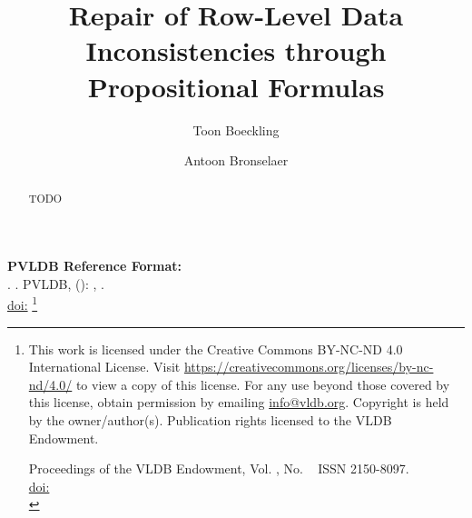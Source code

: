 \title{Repair of Row-Level Data Inconsistencies through Propositional Formulas}

\author{Toon Boeckling}

\author{Antoon Bronselaer}

\begin{abstract}
    TODO
\end{abstract}

\maketitle

\pagestyle{\vldbpagestyle}
\begingroup\small\noindent\raggedright\textbf{PVLDB Reference Format:}\\
\vldbauthors. \vldbtitle. PVLDB, \vldbvolume(\vldbissue): \vldbpages, \vldbyear.\\
\href{https://doi.org/\vldbdoi}{doi:\vldbdoi}
\endgroup
\begingroup
\renewcommand\thefootnote{}\footnote{\noindent
This work is licensed under the Creative Commons BY-NC-ND 4.0 International License. Visit \url{https://creativecommons.org/licenses/by-nc-nd/4.0/} to view a copy of this license. For any use beyond those covered by this license, obtain permission by emailing \href{mailto:info@vldb.org}{info@vldb.org}. Copyright is held by the owner/author(s). Publication rights licensed to the VLDB Endowment. \\
\raggedright Proceedings of the VLDB Endowment, Vol. \vldbvolume, No. \vldbissue\ %
ISSN 2150-8097. \\
\href{https://doi.org/\vldbdoi}{doi:\vldbdoi} \\
}\addtocounter{footnote}{-1}\endgroup

